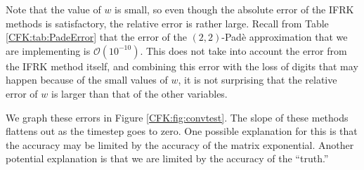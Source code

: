 \documentclass{csri19}
\begin{document}
Note that the value of $w$ is small, so even though the absolute error 
of the IFRK methods is satisfactory, the relative error is rather
 large. Recall from Table \ref{CFK:tab:PadeError} that the error of the 
$(2,2)$-Pad\`e approximation that we are implementing is $\mathcal{O}(10^{-10})$.
This does not take into account the error from the IFRK method itself, 
and combining this error with the loss of digits that may happen because of 
the small values of $w$, it is not surprising that the relative error of 
$w$ is larger than that of the other variables.

We graph these errors in Figure \ref{CFK:fig:convtest}. The slope of these 
methods flattens out as the timestep goes to zero. One possible 
explanation for this is that the accuracy may be limited by the accuracy of 
the matrix exponential. Another potential explanation is that we are 
limited by the accuracy of the ``truth.'' 
\end{document}
